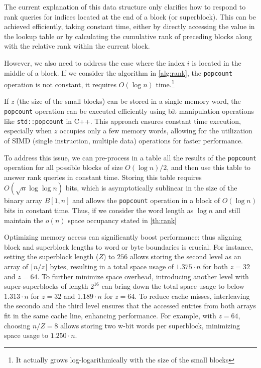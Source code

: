 \noindent The current explanation of this data structure only clarifies how to respond to rank queries for indices located at the end of a block (or superblock). This can be achieved efficiently, taking constant time, either by directly accessing the value in the lookup table or by calculating the cumulative rank of preceding blocks along with the relative rank within the current block. \vspace{0.4cm}

\noindent However, we also need to address the case where the index $i$ is located in the middle of a block. If we consider the algorithm in \ref{alg:rank}, the \texttt{popcount} operation is not constant, it requires $O(\log n)$ time.\footnote{It actually grows log-logarithmically with the size of the small blocks}

\begin{remark}
    If $z$ (the size of the small blocks) can be stored in a single memory word, the \texttt{popcount} operation can be executed efficiently using bit manipulation operations like \texttt{std::popcount} in C++. This approach ensures constant time execution, especially when $z$ occupies only a few memory words, allowing for the utilization of SIMD (single instruction, multiple data) operations for faster performance. \cite{ferragina2023pearls}
\end{remark}

\noindent To address this issue, we can pre-process in a table all the results of the \texttt{popcount} operation for all possible blocks of size $O(\log n)/2$, and then use this table to answer rank queries in constant time. Storing this table requires $O(\sqrt{n} \log \log n)$ bits, which is asymptotically sublinear in the size of the binary array $B[1, n]$ and allows the \texttt{popcount} operation in a block of $O(\log n)$ bits in constant time. Thus, if we consider the word length as $\log n$ and still maintain the $o(n)$ space occupancy stated in \ref{th:rank}  \vspace{0.4cm}


\begin{remark}
    Optimizing memory access can significantly boost performance: thus aligning block and superblock lengths to word or byte boundaries is crucial. For instance, setting the superblock length ($Z$) to $256$ allows storing the second level as an array of $\lceil n/z \rceil$ bytes, resulting in a total space usage of $1.375 \cdot n$ for both $z = 32$ and $z = 64$. To further minimize space overhead, introducing another level with super-superblocks of length $2^{16}$ can bring down the total space usage to below $1.313 \cdot n$ for $z = 32$ and $1.189 \cdot n$ for $z = 64$. To reduce cache misses, interleaving the secondo and the third level ensures that the accessed entries from both arrays fit in the same cache line, enhancing performance. For example, with $z = 64$, choosing $n/Z = 8$ allows storing two w-bit words per superblock, minimizing space usage to $1.250 \cdot n$. \cite{navarro2016compact}
\end{remark}

